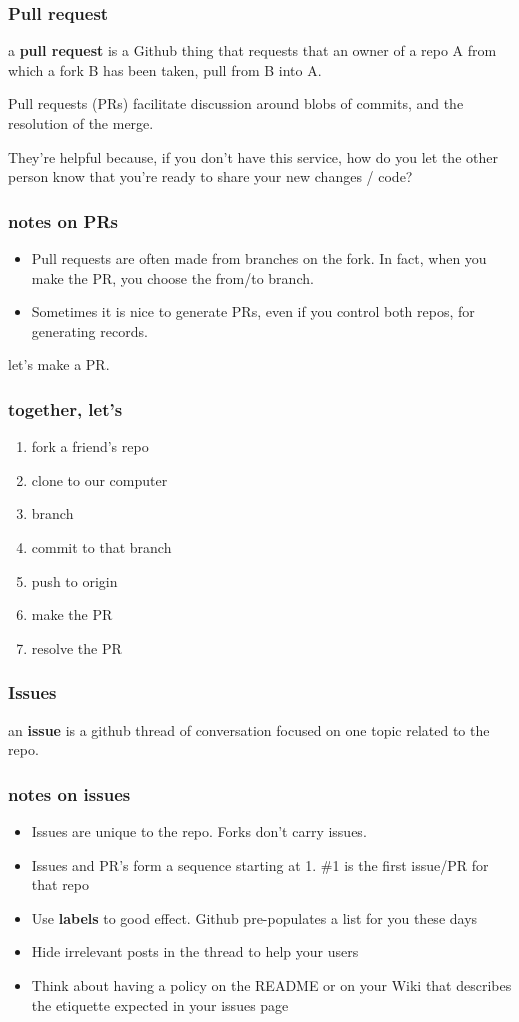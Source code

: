 \documentclass[14pt,aspectratio=1610]{beamer} %
\newcommand{\fframe}[2]{
   \begin{frame}
\frametitle{#1}
#2
\end{frame}
}
\begin{document}
\fframe{Pull request}
{
	\begin{definition}
		a {\bf pull request} is a Github thing that requests that an owner of a repo A from which a fork B has been taken, pull from B into A.
	\end{definition}

	Pull requests (PRs) facilitate discussion around blobs of commits, and the resolution of the merge.

	They're helpful because, if you don't have this service, how do you let the other person know that you're ready to share your new changes / code?
}

\fframe{notes on PRs}
{
\begin{itemize}
	\item Pull requests are often made from branches on the fork.  In fact, when you make the PR, you choose the from/to branch.
	\item Sometimes it is nice to generate PRs, even if you control both repos, for generating records.
\end{itemize}

let's make a PR.
}



\fframe{together, let's}
{
	\begin{enumerate}
		\item fork a friend's repo
		\item clone to our computer
		\item branch
		\item commit to that branch
		\item push to origin
		\item make the PR
		\item resolve the PR
	\end{enumerate}
}

\fframe{Issues}
{
	\begin{definition}
an {\bf issue} is a github thread of conversation focused on one topic related to the repo.
	\end{definition}

}


\fframe{notes on issues}
{
	\begin{itemize}
\item Issues are unique to the repo.  Forks don't carry issues.
\item Issues and PR's form a sequence starting at 1.  \#1 is the first issue/PR for that repo
\item Use {\bf labels}  to good effect.  Github pre-populates a list for you these days
\item Hide irrelevant posts in the thread to help your users
\item Think about having a policy on the README or on your Wiki that describes the etiquette expected in your issues page
	\end{itemize}
}
\end{document}
